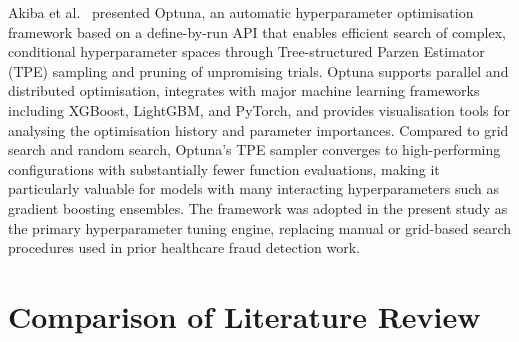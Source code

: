 Akiba et al.\ \cite{akiba2019} presented Optuna, an automatic hyperparameter optimisation framework based on a define-by-run API that enables efficient search of complex, conditional hyperparameter spaces through Tree-structured Parzen Estimator (TPE) sampling and pruning of unpromising trials. Optuna supports parallel and distributed optimisation, integrates with major machine learning frameworks including XGBoost, LightGBM, and PyTorch, and provides visualisation tools for analysing the optimisation history and parameter importances. Compared to grid search and random search, Optuna's TPE sampler converges to high-performing configurations with substantially fewer function evaluations, making it particularly valuable for models with many interacting hyperparameters such as gradient boosting ensembles. The framework was adopted in the present study as the primary hyperparameter tuning engine, replacing manual or grid-based search procedures used in prior healthcare fraud detection work.

\section{Comparison of Literature Review}

\begin{center}
\label{tab:lit_review_comparison}
\end{center}

